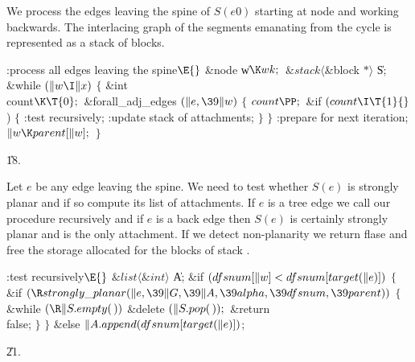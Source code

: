 We process the edges leaving the spine of $S(e0)$ starting at node 
and working backwards. The interlacing graph of the segments emanating from
the cycle is represented as a stack  of blocks.

\Y\B\4:process all edges leaving the spine\X${}\E{}$\6
\&{node} \|w${}\K\\{wk};{}$\6
${}\&{stack}\langle{}$\&{block} ${}{*}\rangle{}$ \|S;\7
\&{while} ${}(\|w\I\|x){}$\5
${}\{{}$\1\6
\&{int} \\{count}${}\K\T{0};{}$\7
\&{forall\_adj\_edges} ${}(\|e,\39\|w){}$\5
${}\{{}$\1\6
${}\\{count}\PP;{}$\6
\&{if} ${}(\\{count}\I\T{1}{}$)\6
${}\{{}$\1\6
:test recursively\X;\6
:update stack  of attachments\X;\6
\4${}\}{}$\2\6
\4${}\}{}$\2\6
:prepare for next iteration\X;\6
${}\|w\K\\{parent}[\|w];{}$\6
\4${}\}{}$\2\par
\U18.\fi

Let $e$ be any edge leaving the spine. We need to test whether
$S(e)$ is strongly planar and if so compute its list  of attachments.
If $e$ is a tree edge we call our procedure recursively and if $e$ is a
back edge then $S(e)$ is certainly strongly planar and  is
the only attachment. If we detect non-planarity we return flase and free
the storage allocated for the blocks of stack .


\Y\B\4:test recursively\X${}\E{}$\6
$\&{list}\langle\&{int}\rangle{}$ \|A;\7
\&{if} ${}(\\{dfsnum}[\|w]<\\{dfsnum}[\\{target}(\|e)]){}$\5
${}\{{}$\1\6
\&{if} ${}(\R\\{strongly\_planar}(\|e,\39\|G,\39\|A,\39\\{alpha},\39\\{dfsnum},%
\39\\{parent})){}$\5
${}\{{}$\1\6
\&{while} ${}(\R\|S.\\{empty}(\,)){}$\1\5
\&{delete} ${}(\|S.\\{pop}(\,));{}$\2\6
\&{return} \\{false};\6
\4${}\}{}$\2\6
\4${}\}{}$\2\6
\&{else}\1\5
${}\|A.\\{append}(\\{dfsnum}[\\{target}(\|e)]){}$;\2\par
\U21.\fi

